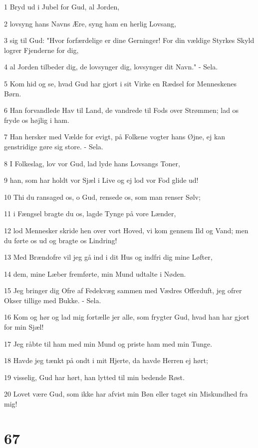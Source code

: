\par 1 Bryd ud i Jubel for Gud, al Jorden,
\par 2 lovsyng hans Navns Ære, syng ham en herlig Lovsang,
\par 3 sig til Gud: "Hvor forfærdelige er dine Gerninger! For din vældige Styrkes Skyld logrer Fjenderne for dig,
\par 4 al Jorden tilbeder dig, de lovsynger dig, lovsynger dit Navn." - Sela.
\par 5 Kom hid og se, hvad Gud har gjort i sit Virke en Rædsel for Menneskenes Børn.
\par 6 Han forvandlede Hav til Land, de vandrede til Fods over Strømmen; lad os fryde os højlig i ham.
\par 7 Han hersker med Vælde for evigt, på Folkene vogter hans Øjne, ej kan genstridige gøre sig store. - Sela.
\par 8 I Folkeslag, lov vor Gud, lad lyde hans Lovsangs Toner,
\par 9 han, som har holdt vor Sjæl i Live og ej lod vor Fod glide ud!
\par 10 Thi du ransaged os, o Gud, rensede os, som man renser Sølv;
\par 11 i Fængsel bragte du os, lagde Tynge på vore Lænder,
\par 12 lod Mennesker skride hen over vort Hoved, vi kom gennem Ild og Vand; men du førte os ud og bragte os Lindring!
\par 13 Med Brændofre vil jeg gå ind i dit Hus og indfri dig mine Løfter,
\par 14 dem, mine Læber fremførte, min Mund udtalte i Nøden.
\par 15 Jeg bringer dig Ofre af Fedekvæg sammen med Vædres Offerduft, jeg ofrer Okser tillige med Bukke. - Sela.
\par 16 Kom og hør og lad mig fortælle jer alle, som frygter Gud, hvad han har gjort for min Sjæl!
\par 17 Jeg råbte til ham med min Mund og priste ham med min Tunge.
\par 18 Havde jeg tænkt på ondt i mit Hjerte, da havde Herren ej hørt;
\par 19 visselig, Gud har hørt, han lytted til min bedende Røst.
\par 20 Lovet være Gud, som ikke har afvist min Bøn eller taget sin Miskundhed fra mig!

\chapter{67}

